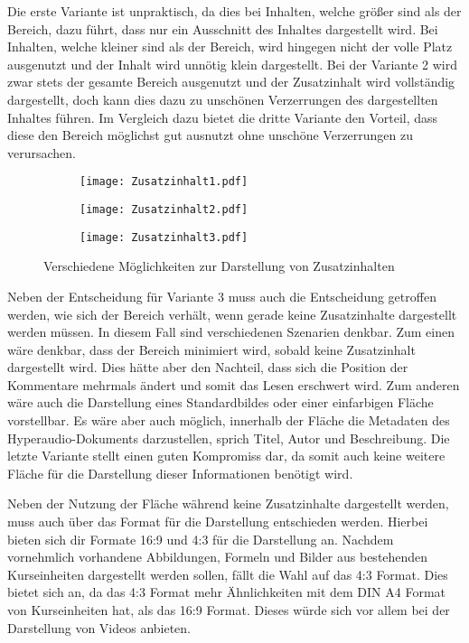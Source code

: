 Die erste Variante ist unpraktisch, da dies bei Inhalten, welche größer sind als der Bereich, dazu führt, dass nur ein Ausschnitt des Inhaltes dargestellt wird. Bei Inhalten, welche kleiner sind als der Bereich, wird hingegen nicht der volle Platz ausgenutzt und der Inhalt wird unnötig klein dargestellt. Bei der Variante 2 wird zwar stets der gesamte Bereich ausgenutzt und der Zusatzinhalt wird vollständig dargestellt, doch kann dies dazu zu unschönen Verzerrungen des dargestellten Inhaltes führen. Im Vergleich dazu bietet die dritte Variante den Vorteil, dass diese den Bereich möglichst gut ausnutzt ohne unschöne Verzerrungen zu verursachen.

\begin{figure}[h!]
\begin{subfigure}[c]{0.32\textwidth}
\texttt{[image: Zusatzinhalt1.pdf]}
\label{fig:Zusatzinhalt1}
\end{subfigure}
\begin{subfigure}[c]{0.32\textwidth}
\texttt{[image: Zusatzinhalt2.pdf]}
\label{fig:Zusatzinhalt2}
\end{subfigure}
\begin{subfigure}[c]{0.32\textwidth}
\texttt{[image: Zusatzinhalt3.pdf]}
\label{fig:Zusatzinhalt3}
\end{subfigure}
\caption{Verschiedene Möglichkeiten zur Darstellung von Zusatzinhalten}
\label{fig:Zusatzinhalt}
\end{figure}

Neben der Entscheidung für Variante 3 muss auch die Entscheidung getroffen werden, wie sich der Bereich verhält, wenn gerade keine Zusatzinhalte dargestellt werden müssen. In diesem Fall sind verschiedenen Szenarien denkbar. Zum einen wäre denkbar, dass der Bereich minimiert wird, sobald keine Zusatzinhalt dargestellt wird. Dies hätte aber den Nachteil, dass sich die Position der Kommentare mehrmals ändert und somit das Lesen erschwert wird. Zum anderen wäre auch die Darstellung eines Standardbildes oder einer einfarbigen Fläche vorstellbar. Es wäre aber auch möglich, innerhalb der Fläche die Metadaten des Hyperaudio-Dokuments darzustellen, sprich Titel, Autor und Beschreibung. Die letzte Variante stellt einen guten Kompromiss dar, da somit auch keine weitere Fläche für die Darstellung dieser Informationen benötigt wird.

Neben der Nutzung der Fläche während keine Zusatzinhalte dargestellt werden, muss auch über das Format für die Darstellung entschieden werden. Hierbei bieten sich dir Formate 16:9 und 4:3 für die Darstellung an. Nachdem vornehmlich vorhandene Abbildungen, Formeln und Bilder aus bestehenden Kurseinheiten dargestellt werden sollen, fällt die Wahl auf das 4:3 Format. Dies bietet sich an, da das 4:3 Format mehr Ähnlichkeiten mit dem DIN A4 Format von Kurseinheiten hat, als das 16:9 Format. Dieses würde sich vor allem bei der Darstellung von Videos anbieten.


